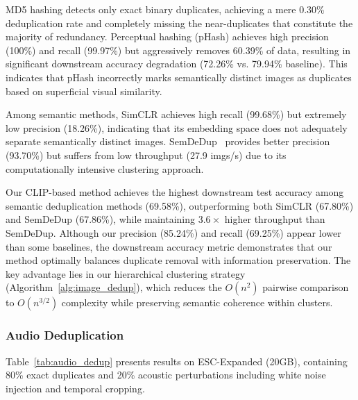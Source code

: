\documentclass[sigconf, nonacm]{acmart}
\begin{document}
MD5 hashing detects only exact binary duplicates, achieving a mere 0.30\% deduplication rate and completely missing the near-duplicates that constitute the majority of redundancy. Perceptual hashing (pHash) achieves high precision (100\%) and recall (99.97\%) but aggressively removes 60.39\% of data, resulting in significant downstream accuracy degradation (72.26\% vs. 79.94\% baseline). This indicates that pHash incorrectly marks semantically distinct images as duplicates based on superficial visual similarity.

Among semantic methods, SimCLR achieves high recall (99.68\%) but extremely low precision (18.26\%), indicating that its embedding space does not adequately separate semantically distinct images. SemDeDup~\cite{abbas2023semdedup} provides better precision (93.70\%) but suffers from low throughput (27.9 imgs/s) due to its computationally intensive clustering approach.


Our CLIP-based method achieves the highest downstream test accuracy among semantic deduplication methods (69.58\%), outperforming both SimCLR (67.80\%) and SemDeDup (67.86\%), while maintaining $3.6 \times$ higher throughput than SemDeDup.
Although our precision (85.24\%) and recall (69.25\%) appear lower than some baselines, the downstream accuracy metric demonstrates that our method optimally balances duplicate removal with information preservation. The key advantage lies in our hierarchical clustering strategy (Algorithm~\ref{alg:image_dedup}), which reduces the $O(n^2)$ pairwise comparison to $O(n^{3/2})$ complexity while preserving semantic coherence within clusters.

\subsubsection{Audio Deduplication}

Table~\ref{tab:audio_dedup} presents results on ESC-Expanded (20GB), containing 80\% exact duplicates and 20\% acoustic perturbations including white noise injection and temporal cropping.
\end{document}
